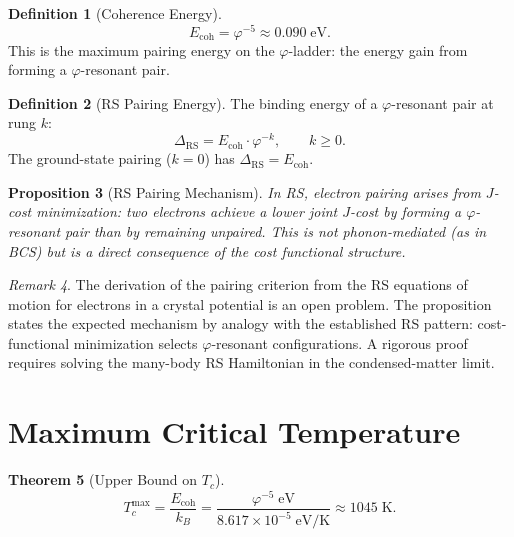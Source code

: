 \documentclass[12pt,a4paper]{article}
\newtheorem{theorem}{Theorem}[section]
\newtheorem{proposition}[theorem]{Proposition}
\theoremstyle{definition}
\newtheorem{definition}[theorem]{Definition}
\theoremstyle{remark}
\newtheorem{remark}[theorem]{Remark}
\begin{document}
\begin{definition}[Coherence Energy]
\begin{equation}
  E_{\mathrm{coh}} = \varphi^{-5} \approx 0.090\;\mathrm{eV}.
\end{equation}
This is the maximum pairing energy on the $\varphi$-ladder:
the energy gain from forming a $\varphi$-resonant pair.
\end{definition}

\begin{definition}[RS Pairing Energy]
The binding energy of a $\varphi$-resonant pair at rung $k$:
\begin{equation}
  \Delta_{\mathrm{RS}} = E_{\mathrm{coh}} \cdot \varphi^{-k},
  \qquad k \geq 0.
\end{equation}
The ground-state pairing ($k = 0$) has
$\Delta_{\mathrm{RS}} = E_{\mathrm{coh}}$.
\end{definition}

\begin{proposition}[RS Pairing Mechanism]
\label{thm:pairing}
In RS, electron pairing arises from $J$-cost minimization: two
electrons achieve a lower joint $J$-cost by forming a
$\varphi$-resonant pair than by remaining unpaired.  This is not
phonon-mediated (as in BCS) but is a direct consequence of the
cost functional structure.
\end{proposition}

\begin{remark}
The derivation of the pairing criterion from the RS equations of
motion for electrons in a crystal potential is an open problem.  The
proposition states the expected mechanism by analogy with the established
RS pattern: cost-functional minimization selects $\varphi$-resonant
configurations.  A rigorous proof requires solving the many-body RS
Hamiltonian in the condensed-matter limit.
\end{remark}

\section{Maximum Critical Temperature}
\label{sec:max-tc}

\begin{theorem}[Upper Bound on $T_c$]
\label{thm:tc-max}
\begin{equation}
  \boxed{T_c^{\max} = \frac{E_{\mathrm{coh}}}{k_B}
  = \frac{\varphi^{-5}\;\mathrm{eV}}
  {8.617 \times 10^{-5}\;\mathrm{eV/K}}
  \approx 1045\;\mathrm{K}.}
\end{equation}
\end{theorem}
\end{document}
